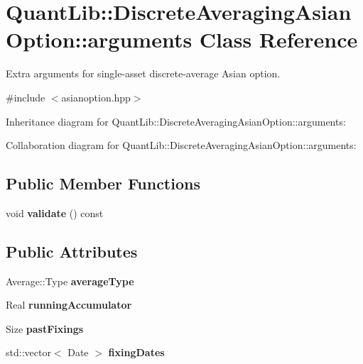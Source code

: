 \section{Quant\+Lib\+:\+:Discrete\+Averaging\+Asian\+Option\+:\+:arguments Class Reference}
\label{class_quant_lib_1_1_discrete_averaging_asian_option_1_1arguments}


Extra arguments for single-\/asset discrete-\/average Asian option.  




{\ttfamily \#include $<$asianoption.\+hpp$>$}



Inheritance diagram for Quant\+Lib\+:\+:Discrete\+Averaging\+Asian\+Option\+:\+:arguments\+:


Collaboration diagram for Quant\+Lib\+:\+:Discrete\+Averaging\+Asian\+Option\+:\+:arguments\+:
\subsection*{Public Member Functions}
\begin{DoxyCompactItemize}
\item 
void {\bfseries validate} () const \label{class_quant_lib_1_1_discrete_averaging_asian_option_1_1arguments_aae508c3db9afaad5144d4b0285c17a98}

\end{DoxyCompactItemize}
\subsection*{Public Attributes}
\begin{DoxyCompactItemize}
\item 
Average\+::\+Type {\bfseries average\+Type}\label{class_quant_lib_1_1_discrete_averaging_asian_option_1_1arguments_ad26cef54ef96d8beed8fe2dd8730e428}

\item 
Real {\bfseries running\+Accumulator}\label{class_quant_lib_1_1_discrete_averaging_asian_option_1_1arguments_a586f70ccafe0751815a745c58b41b3c7}

\item 
Size {\bfseries past\+Fixings}\label{class_quant_lib_1_1_discrete_averaging_asian_option_1_1arguments_a0f6294b1df69a077ad0c99b2ff028304}

\item 
std\+::vector$<$ Date $>$ {\bfseries fixing\+Dates}\label{class_quant_lib_1_1_discrete_averaging_asian_option_1_1arguments_ac87e33dbbfbd7ed4c5876e80b4f672b0}

\end{DoxyCompactItemize}


